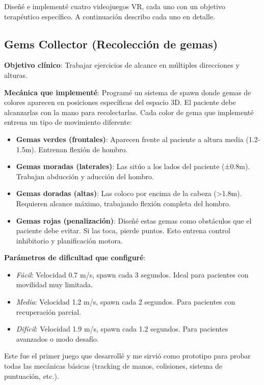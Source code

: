 Diseñé e implementé cuatro videojuegos VR, cada uno con un objetivo terapéutico específico. A continuación describo cada uno en detalle.

\subsection{Gems Collector (Recolección de gemas)}

\textbf{Objetivo clínico}: Trabajar ejercicios de alcance en múltiples direcciones y alturas.

\textbf{Mecánica que implementé}: Programé un sistema de spawn donde gemas de colores aparecen en posiciones específicas del espacio 3D. El paciente debe alcanzarlas con la mano para recolectarlas. Cada color de gema que implementé entrena un tipo de movimiento diferente:

\begin{itemize}
    \item \textbf{Gemas verdes (frontales)}: Aparecen frente al paciente a altura media (1.2-1.5m). Entrenan flexión de hombro.
    
    \item \textbf{Gemas moradas (laterales)}: Las sitúo a los lados del paciente (±0.8m). Trabajan abducción y aducción del hombro.
    
    \item \textbf{Gemas doradas (altas)}: Las coloco por encima de la cabeza (>1.8m). Requieren alcance máximo, trabajando flexión completa del hombro.
    
    \item \textbf{Gemas rojas (penalización)}: Diseñé estas gemas como obstáculos que el paciente debe evitar. Si las toca, pierde puntos. Esto entrena control inhibitorio y planificación motora.
\end{itemize}

\textbf{Parámetros de dificultad que configuré}:
\begin{itemize}
    \item \textit{Fácil}: Velocidad 0.7 m/s, spawn cada 3 segundos. Ideal para pacientes con movilidad muy limitada.
    \item \textit{Media}: Velocidad 1.2 m/s, spawn cada 2 segundos. Para pacientes con recuperación parcial.
    \item \textit{Difícil}: Velocidad 1.9 m/s, spawn cada 1.2 segundos. Para pacientes avanzados o modo desafío.
\end{itemize}

Este fue el primer juego que desarrollé y me sirvió como prototipo para probar todas las mecánicas básicas (tracking de manos, colisiones, sistema de puntuación, etc.).


